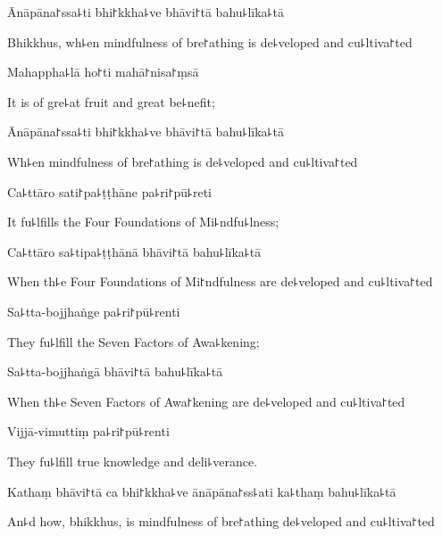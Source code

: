 Ānāpāna꜓ssa꜕ti bhi꜓kkha꜕ve bhāvi꜓tā bahu꜕līka꜕tā

\begin{english}
  Bhikkhus, wh꜕en mindfulness of bre꜓athing is de꜕veloped and cu꜕ltiva꜓ted
\end{english}

Mahappha꜕lā ho꜓ti mahā꜓nisa꜓ṃsā

\begin{english}
  It is of gre꜕at fruit and great be꜕nefit;
\end{english}

Ānāpāna꜓ssa꜕ti bhi꜓kkha꜕ve bhāvi꜓tā bahu꜕līka꜕tā

\begin{english}
  Wh꜕en mindfulness of bre꜓athing is de꜕veloped and cu꜕ltiva꜓ted
\end{english}

Ca꜕ttāro sati꜓pa꜕ṭṭhāne pa꜕ri꜓pū꜕reti

\begin{english}
  It fu꜕lfills the Four Foundations of Mi꜕ndfu꜕lness;
\end{english}

Ca꜕ttāro sa꜕tipa꜕ṭṭhānā bhāvi꜓tā bahu꜕līka꜕tā

\begin{english}
  When th꜕e Four Foundations of Mi꜓ndfulness are de꜕veloped and cu꜕ltiva꜓ted
\end{english}

Sa꜕tta-bojjhaṅge pa꜕ri꜓pū꜕renti

\begin{english}
  They fu꜕lfill the Seven Factors of Awa꜕kening;
\end{english}

Sa꜕tta-bojjhaṅgā bhāvi꜓tā bahu꜕līka꜕tā

\begin{english}
  When th꜕e Seven Factors of Awa꜓kening are de꜕veloped and cu꜕ltiva꜓ted
\end{english}

Vijjā-vimuttiṃ pa꜕ri꜓pū꜕renti

\begin{english}
  They fu꜕lfill true knowledge and deli꜕verance.
\end{english}

Kathaṃ bhāvi꜓tā ca bhi꜓kkha꜕ve ānāpāna꜓ss꜕ati ka꜕thaṃ bahu꜕līka꜕tā

\begin{english}
  An꜕d how, bhikkhus, is mindfulness of bre꜓athing de꜕veloped and cu꜕ltiva꜓ted
\end{english}

